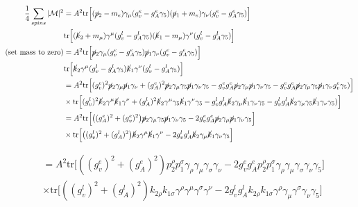 \documentclass[11pt]{article}
\begin{document}
\begin{align*}
\frac{1}{4} \sum_{spins} |\mathcal{M}|^2 &= A^2 \text{tr}
\Big[ (\cancel{p}_2 -m_e)  
\gamma_{\mu} (g_v^e - g_A^e \gamma_5) (\cancel{p}_1 + m_e) 
\gamma_{\nu} (g_v^e - g_A^e \gamma_5)\Big]\\
&\text{tr} \Big[
(\cancel{k}_2 + m_{\mu}) \gamma^{\mu} (g_v^l - g_A^l \gamma_5) (\cancel{k}_1 - m_{\mu}) \gamma^{\nu} (g_v^l - g_A^l \gamma_5) 
\Big]\\
\text{(set mass to zero)}
&= A^2 \text{tr}
\Big[ \cancel{p}_2 
\gamma_{\mu} (g_v^e - g_A^e \gamma_5) \cancel{p}_1 
\gamma_{\nu} (g_v^e - g_A^e \gamma_5)\Big]\\
&\text{tr} \Big[
\cancel{k}_2 \gamma^{\mu} (g_v^l - g_A^l \gamma_5) \cancel{k}_1 \gamma^{\nu} (g_v^l - g_A^l \gamma_5) 
\Big]\\
&= A^2 \text{tr}
\Big[ (g_v^e)^2 \cancel{p}_2 
\gamma_{\mu} 
\cancel{p}_1 
\gamma_{\nu} 
+
(g_A^e)^2
\cancel{p}_2 
\gamma_{\mu} \gamma_5
 \cancel{p}_1 
\gamma_{\nu} \gamma_5
- g_v^e g_A^e 
\cancel{p}_2 
\gamma_{\mu} \cancel{p}_1 
\gamma_{\nu} \gamma_5
- g_v^e g_A^e \cancel{p}_2 
\gamma_{\mu} \gamma_5 \cancel{p}_1 
\gamma_{\nu} g_v^e \gamma_5)
\Big] \\
& \times
\text{tr} \Big[
(g_v^l)^2
\cancel{k}_2 \gamma^{\mu} 
 \cancel{k}_1 \gamma^{\nu} 
+(g_A^l)^2
\cancel{k}_2 \gamma^{\mu} \gamma_5
 \cancel{k}_1 \gamma^{\nu} \gamma_5 
- g_v^l g_A^l 
\cancel{k}_2 
\gamma_{\mu} \cancel{k}_1 
\gamma_{\nu} \gamma_5
- g_v^l g_A^l \cancel{k}_2 
\gamma_{\mu} \gamma_5 \cancel{k}_1 
\gamma_{\nu}\gamma_5)
\Big] \\
&= A^2 \text{tr}
\Big[  
\big((g_A^e)^2 + (g_v^e)^2\big)
\cancel{p}_2 
\gamma_{\mu} \gamma_5
 \cancel{p}_1 
\gamma_{\nu} \gamma_5
- 2 g_v^e g_A^e 
\cancel{p}_2 
\gamma_{\mu} \cancel{p}_1 
\gamma_{\nu} \gamma_5 \Big]\\
& \times
\text{tr} \Big[
\big( (g_v^l)^2 +(g_A^l)^2 \big)
\cancel{k}_2 \gamma^{\mu} 
 \cancel{k}_1 \gamma^{\nu} 
- 2 g_v^l g_A^l 
\cancel{k}_2 
\gamma_{\mu} \cancel{k}_1 
\gamma_{\nu} \gamma_5
\Big] \\
\end{align*}

\begin{align*}
&= A^2 \text{tr}
\Big[
 ((g_v^e)^2 + (g_A^e)^2)p_2^{\rho} p_1^{\sigma} \gamma_{\rho} 
\gamma_{\mu} 
 \gamma_{\sigma}
\gamma_{\nu} 
- 2 g_v^e g_A^e 
p_2^{\rho}  p_1^{\sigma} \gamma_{\rho} \gamma_{\mu}\gamma_{\sigma} \gamma_{\nu} \gamma_5
\Big]\\
&\times \text{tr} \Big[
((g_v^l)^2 + (g_A^l)^2) k_{2 \rho} k_{1 \sigma} \gamma^{\rho} \gamma^{\mu} 
 \gamma^{\sigma} \gamma^{\nu}
 - 2 g_v^l g_A^l 
k_{2 \rho} k_{1 \sigma} \gamma^{\rho}
\gamma_{\mu}  \gamma^{\sigma}
\gamma_{\nu} \gamma_5 
\Big]\\
\end{align*}
\end{document}

